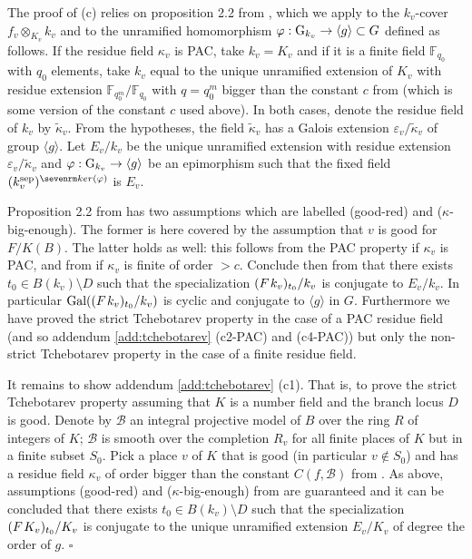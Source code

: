 \documentclass[12pt,english]{amsart}
\newtheorem{twisting lemma}[theorem]{Twisting lemma}
\begin{document}
The proof of (c) relies on proposition 2.2 from \cite{DEGha}, which we apply to the $k_v$-cover $f_v\otimes_{K_v}k_v$ and to the unramified homomorphism $\varphi:{\hbox{\rm G}}_{k_v} \rightarrow \langle g \rangle \subset G$ defined as follows. If the residue field $\kappa_v$ is PAC, take $k_v=K_v$ and if it is a finite field ${\mathbb{F}}_{q_0}$ with $q_0$ elements, take $k_v$ equal to the unique unramified extension of $K_v$ with residue extension ${\mathbb{F}}_{q_0^m}/{\mathbb{F}}_{q_0}$ with $q=q_0^m$  bigger than the constant $c$ from \cite[lemma 2.4]{DEGha} (which is some version of the constant $c$ used above).
In both cases, denote the residue field of $k_v$ by $\tilde \kappa_v$. From the hypotheses, the field $\tilde \kappa_v$ has a Galois extension $\varepsilon_v/\tilde \kappa_v$ of group $\langle g \rangle$. Let $E_v/k_v$  be the unique unramified extension with residue extension $\varepsilon_v/\tilde \kappa_v$ and $\varphi:{\hbox{\rm G}}_{k_v} \rightarrow \langle g \rangle$ be an epimorphism such that the fixed field $(k_v^{{\scriptsize\hbox{\rm sep}}})^{{\sevenrm ker}(\varphi)}$ is $E_v$. 

Proposition 2.2 from \cite{DEGha} has two assumptions which are labelled (good-red) and ($\kappa$-big-enough). The former is here covered by the assumption that $v$ is good for $F/K(B)$. The latter holds as well: this follows from the PAC property if $\kappa_v$ is PAC, and from \cite[lemma 2.4]{DEGha} if $\kappa_v$ is finite of order $> c$. Conclude then from \cite[proposition 2.2]{DEGha} that there exists $t_0\in B(k_v)\setminus D$ such that the specialization $(F\hskip 1pt k_v)_{t_0}/k_v$ is conjugate to $E_v/k_v$. In particular ${\hbox{\rm Gal}}((F\hskip 1pt k_v)_{t_0}/k_v)$ is cyclic and conjugate to $\langle g \rangle$ in $G$. Furthermore we have proved the {strict Tchebotarev property} in the case of a PAC residue field (and so addendum \ref{add:tchebotarev} (c2-PAC) and (c4-PAC)) but only the {non-strict Tchebotarev property} in the case of a finite residue field.

It remains to show addendum \ref{add:tchebotarev} (c1). That is, to prove the strict Tchebotarev property assuming that $K$ is a number field and the branch locus $D$ is good. Denote by ${\mathcal B}$ an integral projective model of $B$ over the ring $R$ of integers of $K$; ${\mathcal B}$ is smooth over the completion $R_v$ for all finite places of $K$ but in a finite subset $S_0$. Pick a place $v$ of $K$ that is good (in particular $v\notin S_0$) and has a residue field $\kappa_v$ of order bigger than the constant $C(f,{\mathcal B})$ from \cite[lemma 3.1]{DEGha}. As above, assumptions (good-red) and ($\kappa$-big-enough) from \cite[proposition 2.2]{DEGha} are guaranteed and it can be concluded that there exists $t_0\in B(k_v)\setminus D$ such that the specialization $(F\hskip 1pt K_v)_{t_0}/K_v$ is conjugate to 
the unique unramified extension $E_v/K_v$ of degree the order of $g$. $\square$
\end{document}
